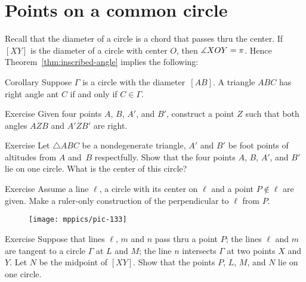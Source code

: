 \section*{Points on a common circle}

Recall that the diameter of a circle is a chord that passes thru the center.
If $[XY]$ is the diameter of a circle with center $O$, then $\measuredangle X O Y\z=\pi$. 
Hence Theorem~\ref{thm:inscribed-angle} implies the following:


\begin{thm}{Corollary}\label{cor:right-angle-diameter}
Suppose $\Gamma$ is a circle with the diameter~$[AB]$.
A triangle $ABC$ has right angle ant $C$ if and only if $C\in\Gamma$.
\end{thm}

\begin{thm}{Exercise}\label{ex:two-right}
Given four points $A$, $B$, $A'$, and $B'$,
construct a point $Z$ such that both angles $AZB$ and $A'ZB'$ are right.
\end{thm}

\begin{thm}{Exercise}\label{ex:VVAA}
Let $\triangle A B C$ be a nondegenerate triangle,
$A'$ and $B'$ be foot points of altitudes from $A$ and~$B$ respectfully.
Show that the four points $A$, $B$, $A'$, and $B'$ lie on one circle.
What is the center of this circle?
\end{thm}

\begin{thm}{Exercise}\label{ex:perpendicular-ruler}
Assume a line $\ell$, 
a circle with its center on $\ell$ 
and a point $P\notin\ell$ are given.
Make a ruler-only construction of the perpendicular to $\ell$
from $P$.
\end{thm}

\begin{wrapfigure}{r}{34mm}
\vskip-4mm
\centering
\texttt{[image: mppics/pic-133]}
\end{wrapfigure}

\begin{thm}{Exercise}\label{ex:tnagents+midpoint}
Suppose that lines $\ell$, $m$ and $n$ pass thru a point $P$;
the lines $\ell$ and $m$ are tangent to a circle $\Gamma$ at $L$ and $M$;
the line $n$ intersects $\Gamma$ at two points $X$ and $Y$.
Let $N$ be the midpoint of $[XY]$.
Show that the points $P$, $L$, $M$, and $N$ lie on one circle.
\end{thm}

